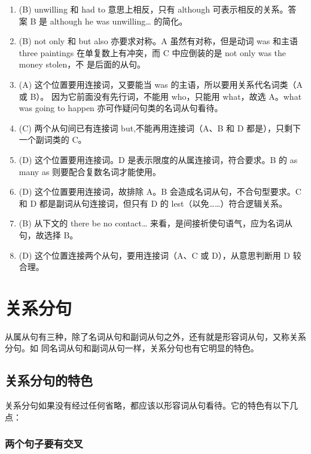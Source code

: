 \begin{enumerate}
\item (B) unwilling 和 had to 意思上相反，只有 although 可表示相反的关系。答
  案 B 是 although he was unwilling… 的简化。

\item (B) not only 和 but also 亦要求对称。A 虽然有对称，但是动词 was 和主语 three
  paintings 在单复数上有冲突，而 C 中应倒装的是 not only was the money stolen，不
  是后面的从句。


\item (A) 这个位置要用连接词，又要能当 was 的主语，所以要用关系代名词类（A 或 B）。
  因为它前面没有先行词，不能用 who，只能用 what，故选 A。what was going to
  happen 亦可作疑问句类的名词从句看待。

\item  (C) 两个从句间已有连接词 but,不能再用连接词（A、B 和 D 都是），只剩下一个副词类的 C。

\item (D) 这个位置要用连接词。D 是表示限度的从属连接词，符合要求。B 的 as many as 则要配合复数名词才能使用。
\item (D) 这个位置要用连接词，故排除 A。B 会造成名词从句，不合句型要求。C 和 D 都是副词从句连接词，但只有 D 的 lest（以免……）符合逻辑关系。
\item (B) 从下文的 there be no contact… 来看，是间接祈使句语气，应为名词从句，故选择 B。

\item (D) 这个位置连接两个从句，要用连接词（A、C 或 D），从意思判断用 D 较合理。
\end{enumerate}

\chapter{关系分句}

从属从句有三种，除了名词从句和副词从句之外，还有就是形容词从句，又称关系分句。如
同名词从句和副词从句一样，关系分句也有它明显的特色。

\section{关系分句的特色}

关系分句如果没有经过任何省略，都应该以形容词从句看待。它的特色有以下几点：

\subsection{两个句子要有交叉}

